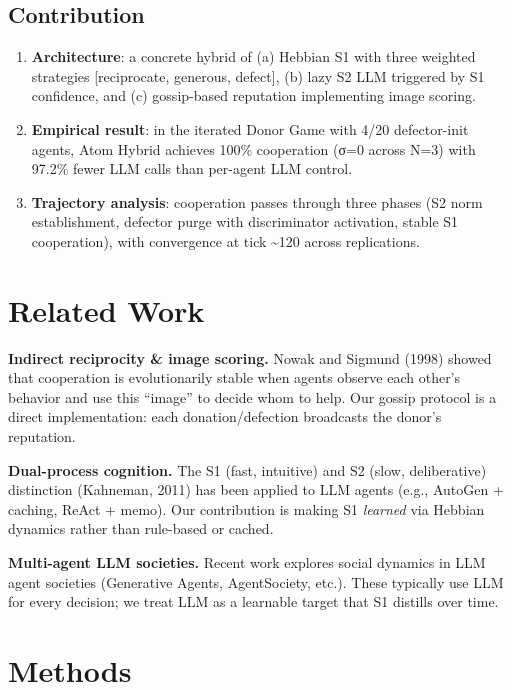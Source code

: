 \documentclass[
  11pt,
  letterpaper,
]{article}
\providecommand{\tightlist}{%
  \setlength{\itemsep}{0pt}\setlength{\parskip}{0pt}}
\begin{document}
\subsection{Contribution}\label{contribution}

\begin{enumerate}
\def\labelenumi{\arabic{enumi}.}
\tightlist
\item
  \textbf{Architecture}: a concrete hybrid of (a) Hebbian S1 with three
  weighted strategies {[}reciprocate, generous, defect{]}, (b) lazy S2
  LLM triggered by S1 confidence, and (c) gossip-based reputation
  implementing image scoring.
\item
  \textbf{Empirical result}: in the iterated Donor Game with 4/20
  defector-init agents, Atom Hybrid achieves 100\% cooperation (σ=0
  across N=3) with 97.2\% fewer LLM calls than per-agent LLM control.
\item
  \textbf{Trajectory analysis}: cooperation passes through three phases
  (S2 norm establishment, defector purge with discriminator activation,
  stable S1 cooperation), with convergence at tick \textasciitilde120
  across replications.
\end{enumerate}

\section{Related Work}\label{related-work}

\textbf{Indirect reciprocity \& image scoring.} Nowak and Sigmund (1998)
showed that cooperation is evolutionarily stable when agents observe
each other's behavior and use this ``image'' to decide whom to help. Our
gossip protocol is a direct implementation: each donation/defection
broadcasts the donor's reputation.

\textbf{Dual-process cognition.} The S1 (fast, intuitive) and S2 (slow,
deliberative) distinction (Kahneman, 2011) has been applied to LLM
agents (e.g., AutoGen + caching, ReAct + memo). Our contribution is
making S1 \emph{learned} via Hebbian dynamics rather than rule-based or
cached.

\textbf{Multi-agent LLM societies.} Recent work explores social dynamics
in LLM agent societies (Generative Agents, AgentSociety, etc.). These
typically use LLM for every decision; we treat LLM as a learnable target
that S1 distills over time.

\section{Methods}\label{methods}
\end{document}
